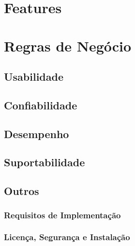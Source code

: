 \section{Features}


\section{Regras de Negócio}

\subsection{Usabilidade}

\subsection{Confiabilidade}

\subsection{Desempenho}

\subsection{Suportabilidade}

\subsection{Outros}
\subsubsection{Requisitos de Implementação}
\subsubsection{Licença, Segurança e Instalação}